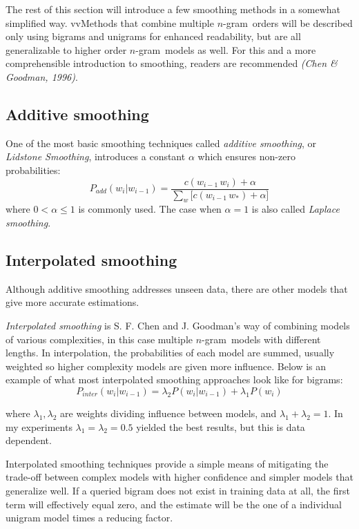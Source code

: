 \documentclass[a4paper,11pt]{kth-mag}
\newcommand{\ngram}{$n$-gram}
\begin{document}
The rest of this section will introduce a few smoothing methods in a somewhat simplified way.
vvMethods that combine multiple \ngram~orders will be described only using bigrams and
unigrams for enhanced readability,
but are all generalizable to higher order \ngram~models as well.
For this and a more comprehensible introduction to smoothing,
readers are recommended \emph{(Chen \& Goodman, 1996)}.

\subsection{Additive smoothing}
One of the most basic smoothing techniques called \emph{additive smoothing},
or \emph{Lidstone Smoothing}, introduces a constant $\alpha$ which ensures
non-zero probabilities\cite{chen_goodman}:
\begin{equation} \label{eq:additive_smoothing}
P_{add}(w_i|w_{i-1}) = \frac{c(w_{i-1}\,w_i)+\alpha}{\sum_{w} \big[c(w_{i-1}\, w_*)+\alpha\big]}
\end{equation}
where $0 < \alpha \leq 1$ is commonly used. The case when $\alpha=1$ is also called \emph{Laplace smoothing}\cite{nlp_book}.


\subsection{Interpolated smoothing}
Although additive smoothing addresses unseen data, there are other models that give more accurate estimations.

\emph{Interpolated smoothing} is S. F. Chen and J. Goodman's way of combining models of various complexities,
in this case multiple \ngram~models with different lengths. In interpolation, the probabilities of each model are summed, usually weighted so higher complexity models are given more influence\cite{chen_goodman}.
Below is an example of what most interpolated smoothing approaches look like for bigrams:
\begin{equation}\label{eq:interpolated_smoothing}
  P_{inter}(w_i|w_{i-1}) =
  \lambda_2 P(w_i|w_{i-1}) + \lambda_1 P(w_i)
\end{equation}

where $\lambda_1, \lambda_2$ are weights dividing influence between models, and $\lambda_1 + \lambda_2 = 1$.
In my experiments $\lambda_1 = \lambda_2 = 0.5$ yielded the best results, but this is data dependent.

Interpolated smoothing techniques provide a simple means of mitigating
the trade-off between complex models with higher confidence
and simpler models that generalize well.
If a queried bigram does not exist in training data at all,
the first term will effectively equal zero,
and the estimate will be the one of a individual unigram model times a reducing factor.
\end{document}
